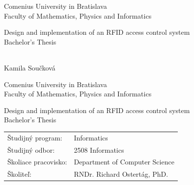 \def\mfrok{2016}
\def\mfnazov{Design and implementation of an RFID access control system}
\def\mftyp{Bachelor's Thesis}
\def\mfautor{Kamila Součková}
\def\mfskolitel{RNDr. Richard Ostertág, PhD. }


\def\mfmiesto{Bratislava, \mfrok}

\def\mfodbor{2508 Informatics}
\def\program{ Informatics }
\def\mfpracovisko{ Department of Computer Science }

\thispagestyle{empty}

\begin{center}
\sc\large
Comenius University in Bratislava\\
Faculty of Mathematics, Physics and Informatics

\vfill

{\LARGE\mfnazov}\\
\mftyp
\end{center}

\vfill

{\sc\large
\noindent \mfrok\\
\mfautor
}

\eject %


\thispagestyle{empty}
\noindent

\begin{center}
\sc
\large
Comenius University in Bratislava\\
Faculty of Mathematics, Physics and Informatics

\vfill

{\LARGE\mfnazov}\\
\mftyp
\end{center}

\vfill

\noindent
\begin{tabular}{ll}
Študijný program: & \program \\
Študijný odbor: & \mfodbor \\
Školiace pracovisko: & \mfpracovisko \\
Školiteľ: & \mfskolitel \\
\end{tabular}

